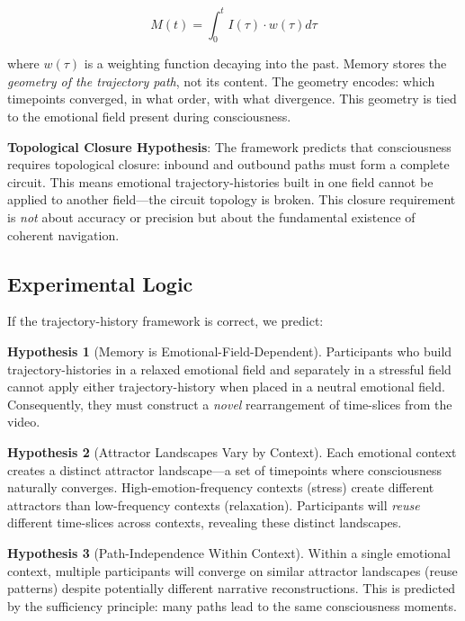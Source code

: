 \documentclass[12pt,a4paper]{article}
\theoremstyle{definition}
\newtheorem{hypothesis}{Hypothesis}
\begin{document}
\begin{equation}
M(t) = \int_0^t I(\tau) \cdot w(\tau) d\tau
\end{equation}

where $w(\tau)$ is a weighting function decaying into the past. Memory stores the \textit{geometry of the trajectory path}, not its content. The geometry encodes: which timepoints converged, in what order, with what divergence. This geometry is tied to the emotional field present during consciousness.

\textbf{Topological Closure Hypothesis}: The framework predicts that consciousness requires topological closure: inbound and outbound paths must form a complete circuit. This means emotional trajectory-histories built in one field cannot be applied to another field---the circuit topology is broken. This closure requirement is \textit{not} about accuracy or precision but about the fundamental existence of coherent navigation.

\subsection{Experimental Logic}

If the trajectory-history framework is correct, we predict:

\begin{hypothesis}[Memory is Emotional-Field-Dependent]
Participants who build trajectory-histories in a relaxed emotional field and separately in a stressful field cannot apply either trajectory-history when placed in a neutral emotional field. Consequently, they must construct a \textit{novel} rearrangement of time-slices from the video.
\end{hypothesis}

\begin{hypothesis}[Attractor Landscapes Vary by Context]
Each emotional context creates a distinct attractor landscape---a set of timepoints where consciousness naturally converges. High-emotion-frequency contexts (stress) create different attractors than low-frequency contexts (relaxation). Participants will \textit{reuse} different time-slices across contexts, revealing these distinct landscapes.
\end{hypothesis}

\begin{hypothesis}[Path-Independence Within Context]
Within a single emotional context, multiple participants will converge on similar attractor landscapes (reuse patterns) despite potentially different narrative reconstructions. This is predicted by the sufficiency principle: many paths lead to the same consciousness moments.
\end{hypothesis}
\end{document}
